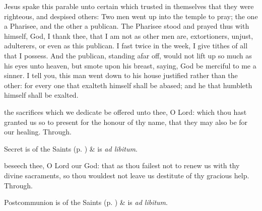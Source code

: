
 Jesus spake this parable unto certain which trusted in themselves that they were righteous, and despised others: Two men went up into the temple to pray; the one a Pharisee, and the other a publican. The Pharisee stood and prayed thus with himself, God, I thank thee, that I am not as other men are, extortioners, unjust, adulterers, or even as this publican. I fast twice in the week, I give tithes of all that I possess. And the publican, standing afar off, would not lift up so much as his eyes unto heaven, but smote upon his breast, saying, God be merciful to me a sinner. I tell you, this man went down to his house justified rather than the other: for every one that exalteth himself shall be abased; and he that humbleth himself shall be exalted.

\clearpage


\secret
{} the sacrifices which we dedicate be offered unto thee, O Lord: which thou hast granted us so to present for the honour of thy name, that they may also be for our healing. Through.
\begin{rubric}
     Secret is of the Saints (p. \pageref{SPSaints}) \&  is \emph{ad libitum}.
\end{rubric}


\postcommunion
{} beseech thee, O Lord our God: that as thou failest not to renew us with thy divine sacraments, so thou wouldest not leave us destitute of thy gracious help. Through.
\begin{rubric}
     Postcommunion is of the Saints (p. \pageref{SPSaints}) \&  is \emph{ad libitum}.
\end{rubric}

